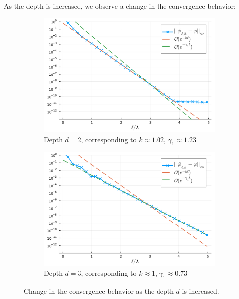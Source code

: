 \documentclass[11pt]{article}
\begin{document}
As the depth is increased, we observe a change in the convergence behavior:

\begin{figure}
  \centering
  \begin{subfigure}{0.49\linewidth}
    \includegraphics[width=\textwidth]{figures/convergence_pml_planewave_depth_2.pdf}
    \caption{Depth $d=2$, corresponding to $k \approx 1.02$, $\gamma_1 \approx 1.23$}
    \label{fig:convergence-modal-solution-depth-3}
  \end{subfigure}
  \begin{subfigure}{0.49\linewidth}
    \includegraphics[width=1\textwidth]{figures/convergence_pml_planewave_depth_3.pdf}
    \caption{Depth $d=3$, corresponding to $k \approx 1$, $\gamma_1 \approx 0.73$}
    \label{fig:convergence-modal-solution-depth-4}
  \end{subfigure}
  \label{fig:convergence-modal-solution}
  \caption{Change in the convergence behavior as the depth $d$ is increased.}
\end{figure}
\end{document}
